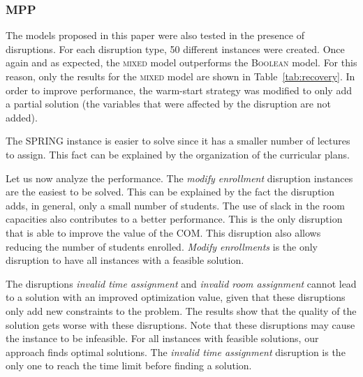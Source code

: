 \documentclass[runningheads]{llncs}
\begin{document}
\vspace{-0.4cm}

\subsubsection{MPP}

The models proposed in this paper were also tested in the presence of disruptions. For each disruption type, 50 different instances were created. Once again and as expected, the \textsc{mixed} model outperforms the \textsc{Boolean} model. For this reason, only the results for the \textsc{mixed} model are shown in Table~\ref{tab:recovery}. In order to improve performance, the warm-start strategy was modified to only add a partial solution (the variables that were affected by the disruption are not added).

The \textsc{SPRING} instance is easier to solve since it has a smaller number of lectures to assign. This fact can be explained by the organization of the curricular plans. %

Let us now analyze the performance. The \textit{modify enrollment} disruption instances are the easiest to be solved. This can be explained by the fact the disruption adds, in general, only a small number of students. The use of slack in the room capacities also contributes to a better performance. This is the only disruption that is able to improve the value of the COM. This disruption also allows reducing the number of students enrolled. \textit{Modify enrollments} is the only disruption to have all instances with a feasible solution. 

The disruptions \textit{invalid time assignment} and \textit{invalid room assignment} cannot lead to a solution with an improved optimization value, given that these disruptions only add new constraints to the problem. The results show that the quality of the solution gets worse with these disruptions. Note that these disruptions may cause the instance to be infeasible. For all instances with feasible solutions, our approach finds optimal solutions. The \textit{invalid time assignment} disruption is the only one to reach the time limit before finding a solution. 

\end{document}
